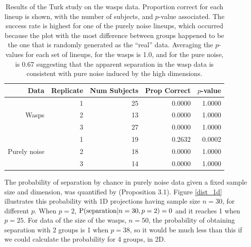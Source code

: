 \begin{table}[ht]
\begin{center}
\caption{Results of the Turk study on the wasps data. Proportion correct for each lineup is shown, with the number of subjects, and $p$-value associated. The success rate is highest for one of the purely noise lineups, which occurred because the plot with the most difference between groups happened to be the one that is randomly generated as the ``real'' data. Averaging the $p$-values for each set of lineups, for the wasps is 1.0, and for the pure noise, is 0.67 suggesting that the apparent separation in the wasp data is consistent with pure noise induced by the high dimensions.}
\vspace{0.15cm}
\begin{tabular}{r|r|r|rr}
\hline
  \hline
 Data & Replicate & Num Subjects & Prop Correct & $p$-value\\ 
  \hline
  & 1 & 25 & 0.0000 &  1.0000\\
Wasps & 2 & 13 & 0.0000 &  1.0000\\ 
 & 3 & 27 & 0.0000 &  1.0000\\
 \hline
 & 1 & 19 & 0.2632 &  0.0002\\
Purely noise & 2 & 18 & 0.0000 &  1.0000 \\ 
 & 3 & 14 & 0.0000 &  1.0000\\
   \hline
\end{tabular}
\label{wasp}
\end{center}
\end{table}

The probability of separation by chance in purely noise data given a fixed sample size and dimension,  was quantified by \cite{ripley:1996} (Proposition 3.1). Figure \ref{dist_1d} illustrates this probability with 1D projections having sample size $n = 30$, for different $p$. When $p = 2$, $\hbox{P(separation}|n = 30, p = 2) = 0$ and it reaches 1 when $p = 25$. For data of the size of the wasps, $n = 50$, the probability of obtaining separation with 2 groups is 1 when $p = 38$, so it would be much less than this if we could calculate the probability for 4 groups, in 2D.


